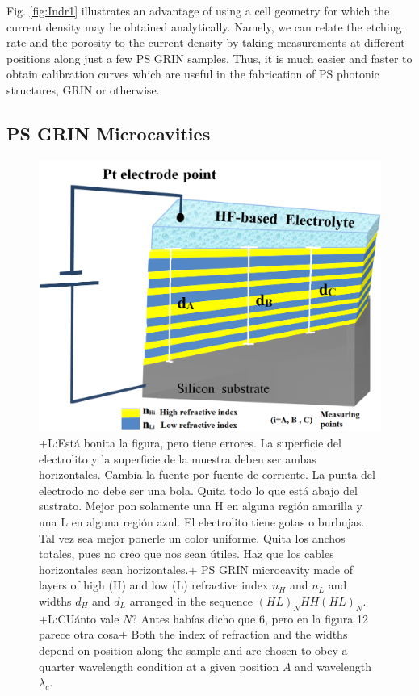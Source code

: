 \documentclass{article}
\newcommand{\notaL}[1]{{\color{blue}+L:#1+}}
\begin{document}
Fig. \ref{fig:Indr1} illustrates an advantage of using a cell
geometry for which the current density may be obtained
analytically. Namely, we can relate the etching rate and the
porosity to the current density by taking measurements at
different positions along just a few PS GRIN samples. Thus, it is much easier
and faster to obtain calibration curves which are useful in the
fabrication of PS photonic structures, GRIN or otherwise.

\subsection{PS GRIN Microcavities}
\label{sec:grin-porous-silicon}
\begin{figure}
  \centering
  \includegraphics[width=\textwidth]{Images/MicrGrin}
  \caption{\notaL{Está bonita la figura, pero tiene errores. La
      superficie del electrolito y la superficie de la muestra
      deben ser ambas horizontales. Cambia la fuente por fuente
      de corriente. La punta del electrodo no debe ser una
      bola. Quita todo lo que está abajo del sustrato. Mejor pon
      solamente una H en alguna región amarilla y una L en
      alguna región azul. El electrolito tiene gotas o
      burbujas. Tal vez sea mejor ponerle un color uniforme. Quita los
      anchos totales, pues no creo que nos sean útiles. Haz que los cables
      horizontales sean horizontales.}
    PS GRIN microcavity made of layers of high (H) and low (L)
    refractive index $n_H$ and $n_L$ and widths $d_H$ and $d_L$
    arranged in the sequence $(HL)_NHH(HL)_N$. \notaL{CUánto vale $N$?
    Antes habías dicho que 6, pero en la figura 12 parece otra cosa} Both the index of
    refraction and the widths depend on position along the
    sample and are chosen to obey a quarter wavelength
    condition at a given position $A$ and wavelength $\lambda_c$.
  }
  \label{fig:MCGRIN0}
\end{figure}
\end{document}
